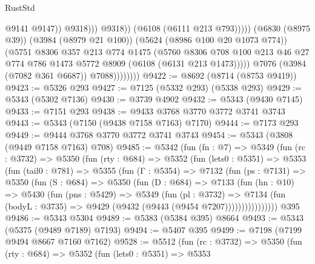 \begin{lexlean}{RustStd}
\begin{coremodule}
                                          @9141
                                          @9147))
                                      @9318)))
                                @9318))
                            (@6108 (@6111 @213 @793)))))
                      (@6830 (@8975 @39))
                      (@3984 (@8979 @21 @100))
                      (@5624 (@8986 @100 @20 @1073 @774))
                      (@5751
                        @8306
                        @357
                        @213
                        @774
                        @1475
                        (@5760
                          @8306
                          @708
                          @100
                          @213
                          @46
                          @27
                          @774
                          @786
                          @1473
                          @5772
                          @8909
                          (@6108 (@6131 @213 @1473)))))
                    @7076
                    (@3984 (@7082 @361 @6687))
                    @7088))))))))
@9422 := @8692 (@8714 (@8753 @9419))
@9423 := @5326 @293
@9427 := @7125 (@5332 @293) (@5338 @293)
@9429 := @5343 (@5302 @7136)
@9430 := @3739 @4902
@9432 := @5343 (@9430 @7145)
@9433 := @7151 @293
@9438 := @9433 @3768 @3770 @3772 @3741 @3743
@9443 := @5343 (@7150 (@9438 @7158 @7163) @7170)
@9444 := @7173 @293
@9449 := @9444 @3768 @3770 @3772 @3741 @3743
@9454 := @5343 (@3808 (@9449 @7158 @7163) @708)
@9485 := @5342
    (fun (fn : @7) =>
    @5349
      (fun (rc : @3732) =>
      @5350
        (fun (rty : @684) =>
        @5352
          (fun (lets0 : @5351) =>
          @5353
            (fun (tail0 : @781) =>
            @5355
              (fun (Γ : @5354) =>
              @7132
                (fun (ps : @7131) =>
                @5350
                  (fun (S : @684) =>
                  @5350
                    (fun (D : @684) =>
                    @7133
                      (fun (hn : @10) =>
                      @5430
                        (fun (pns : @5429) =>
                        @5349
                          (fun (pl : @3732) =>
                          @7134
                            (fun (bodyL : @3735) => @9429 (@9432 (@9443 (@9454 @7207))))))))))))))))
    @395
@9486 := @5343 @5304
@9489 := @5383 (@5384 @395) @8664
@9493 := @5343 (@5375 (@9489 @7189) @7193)
@9494 := @5407 @395
@9499 := @7198 (@7199 @9494 @8667 @7160 @7162)
@9528 := @5512
    (fun (rc : @3732) =>
    @5350
      (fun (rty : @684) =>
      @5352
        (fun (lets0 : @5351) =>
        @5353

\end{coremodule}
\end{lexlean}
